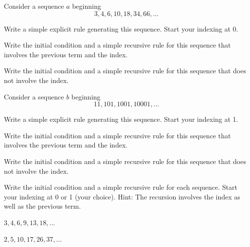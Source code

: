 \begin{exer}[\exerU] %
\label{exer_rec_seq_two_diff_powers2}
    Consider a sequence $a$ beginning
        $$3, 4, 6, 10, 18, 34, 66, \ldots$$
        \begin{exerpart}
            \item Write a simple explicit rule generating this sequence. Start your indexing at 0.
            \item Write the initial condition and a simple recursive rule for this sequence that involves the previous term and the index.
            \item Write the initial condition and a simple recursive rule for this sequence that does not involve the index.  
        \end{exerpart}
\end{exer}

\begin{exer}[\exerU] %
\label{exer_rec_seq_two_diff_powers10}
    Consider a sequence $b$ beginning
        $$11, 101, 1001, 10001, \ldots$$
        \begin{exerpart}
            \item Write a simple explicit rule generating this sequence. Start your indexing at 1.
            \item Write the initial condition and a simple recursive rule for this sequence that involves the previous term and the index.
            \item Write the initial condition and a simple recursive rule for this sequence that does not involve the index.  
        \end{exerpart}
\end{exer}

\begin{exer}[\exerU] %
\label{exer_ntr_uses_index}
    Write the initial condition and a simple recursive rule for each sequence.  Start your indexing at 0 or 1 (your choice). Hint: The recursion involves the index as well as the previous term.
        \begin{exerpart}
            \item $3, 4, 6, 9, 13, 18, \ldots$
            \item $2, 5, 10, 17, 26, 37, \ldots$
        \end{exerpart}
\end{exer}

